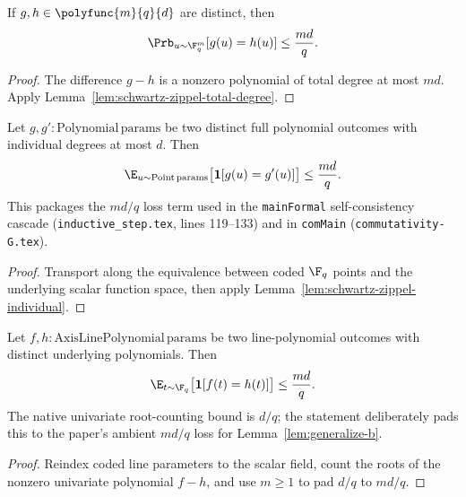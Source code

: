 \begin{lemma}\label{lem:schwartz-zippel-individual}
	\leanok
	If $g,h \in \polyfunc{m}{q}{d}$ are distinct, then
	\[
		\Prb_{u \sim \F_q^m}[g(u)=h(u)] \le \frac{md}{q}.
	\]
\end{lemma}
\begin{proof}
	\leanok
	The difference $g-h$ is a nonzero polynomial of total degree at most $md$. Apply Lemma~\ref{lem:schwartz-zippel-total-degree}.
\end{proof}

\begin{lemma}\label{lem:polynomial-agreement-mdq}
	\leanok
	Let $g, g' : \mathrm{Polynomial}\,\mathrm{params}$ be two distinct full polynomial outcomes with individual degrees at most $d$. Then
	\[
		\E_{u \sim \mathrm{Point}\,\mathrm{params}}\bigl[\mathbf{1}[g(u) = g'(u)]\bigr] \le \frac{md}{q}.
	\]
	This packages the $md/q$ loss term used in the \texttt{mainFormal} self-consistency cascade (\texttt{inductive\_step.tex}, lines 119--133) and in \texttt{comMain} (\texttt{commutativity-G.tex}).
\end{lemma}
\begin{proof}
	\leanok
	Transport along the equivalence between coded $\F_q$ points and the underlying scalar function space, then apply Lemma~\ref{lem:schwartz-zippel-individual}.
\end{proof}

\begin{lemma}\label{lem:axis-line-polynomial-agreement-mdq}
	\leanok
	Let $f,h : \mathrm{AxisLinePolynomial}\,\mathrm{params}$ be two line-polynomial outcomes with distinct underlying polynomials. Then
	\[
		\E_{t \sim \F_q}\bigl[\mathbf{1}[f(t)=h(t)]\bigr] \le \frac{md}{q}.
	\]
	The native univariate root-counting bound is $d/q$; the statement deliberately pads this to the paper's ambient $md/q$ loss for Lemma~\ref{lem:generalize-b}.
\end{lemma}
\begin{proof}
	\leanok
	Reindex coded line parameters to the scalar field, count the roots of the nonzero univariate polynomial $f-h$, and use $m\ge 1$ to pad $d/q$ to $md/q$.
\end{proof}

